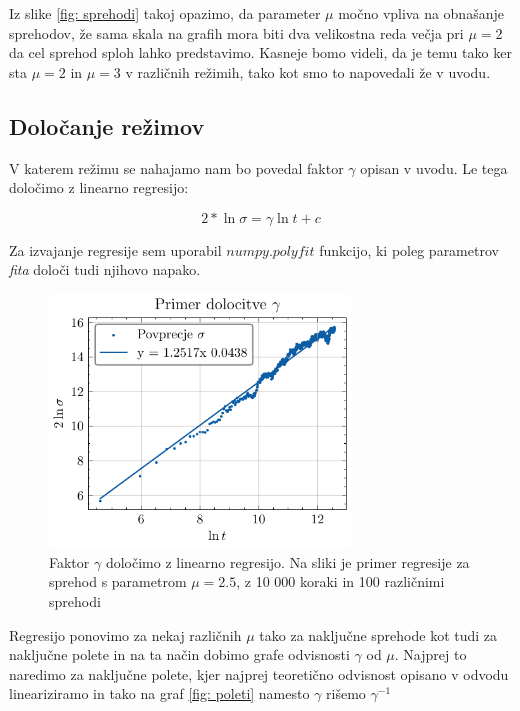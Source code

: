 \documentclass[slovene,11pt,a4paper]{article}
\begin{document}
Iz slike \ref{fig: sprehodi} takoj opazimo, da parameter $\mu$ močno vpliva na obnašanje sprehodov, že sama skala na grafih mora biti dva velikostna reda večja pri $\mu = 2$ da cel sprehod sploh lahko predstavimo. Kasneje bomo videli, da je temu tako ker sta $\mu = 2$ in $\mu = 3$ v različnih režimih, tako kot smo to napovedali že v uvodu.

\subsection{Določanje režimov}

V katerem režimu se nahajamo nam bo povedal faktor $\gamma$ opisan v uvodu. Le tega določimo z linearno regresijo:

$$
  2 * \ln \sigma = \gamma \ln t + c
$$

Za izvajanje regresije sem uporabil $numpy.polyfit$ funkcijo, ki poleg parametrov \textit{fita} določi tudi njihovo napako.

\begin{figure}[ht]
\begin{center}
  \includegraphics[width=8cm]{graphs/Primerdolocitvegamma.pdf}
  \caption{Faktor $\gamma$ določimo z linearno regresijo. Na sliki je primer regresije za sprehod s parametrom $\mu = 2.5$, z 10 000 koraki in 100 različnimi sprehodi}
  \label{fig: dol_gamma}
\end{center}
\end{figure}

Regresijo ponovimo za nekaj različnih $\mu$ tako za naključne sprehode kot tudi za naključne polete in na ta način dobimo grafe odvisnosti $\gamma$ od $\mu$. Najprej to naredimo za naključne polete, kjer najprej teoretično odvisnost opisano v odvodu lineariziramo in tako na graf \ref{fig: poleti} namesto $\gamma$ rišemo $\gamma^{-1}$
\end{document}
